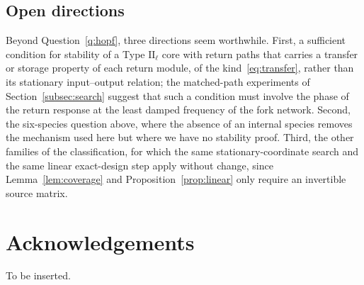 \documentclass[11pt,a4paper]{article}
\theoremstyle{plain}
\theoremstyle{definition}
\theoremstyle{remark}
\numberwithin{equation}{section}
\newcommand{\II}{\mathrm{II}}
\begin{document}
\subsection*{Open directions}
Beyond Question~\ref{q:hopf}, three directions seem worthwhile. First, a sufficient condition for stability of a Type $\II_\ell$ core with return paths that carries a transfer or storage property of each return module, of the kind~\eqref{eq:transfer}, rather than its stationary input--output relation; the matched-path experiments of Section~\ref{subsec:search} suggest that such a condition must involve the phase of the return response at the least damped frequency of the fork network. Second, the six-species question above, where the absence of an internal species removes the mechanism used here but where we have no stability proof. Third, the other families of the classification, for which the same stationary-coordinate search and the same linear exact-design step apply without change, since Lemma~\ref{lem:coverage} and Proposition~\ref{prop:linear} only require an invertible source matrix.

\section*{Acknowledgements}
To be inserted.


\begingroup
\sloppy

\endgroup
\end{document}
